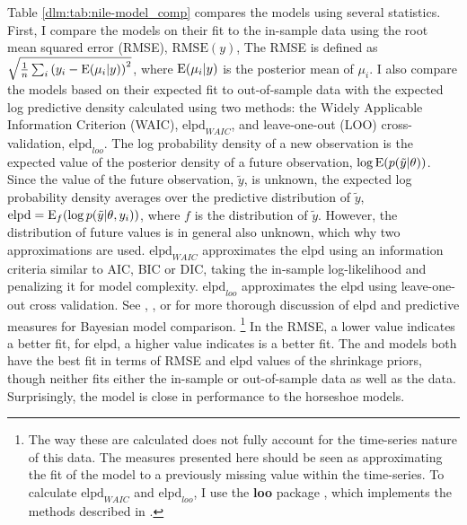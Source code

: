 \documentclass[12pt]{article}
\begin{document}
Table \ref{dlm:tab:nile-model_comp} compares the models using several statistics.
First, I compare the models on their fit to the in-sample data using the root mean squared error (RMSE), $\mathrm{RMSE}(y)$,
The RMSE is defined as $\sqrt{\frac{1}{n} \sum_{i} {(y_{i} - \operatorname{E}(\mu_{i} | y))}^{2}}$, where $\operatorname{E}(\mu_{i} | y)$ is the posterior mean of $\mu_{i}$.
I also compare the models based on their expected fit to out-of-sample data with the expected log predictive density calculated using two methods: the Widely Applicable Information Criterion (WAIC), $\mathrm{elpd}_{WAIC}$, and leave-one-out (LOO) cross-validation, $\mathrm{elpd}_{loo}$.
The log probability density of a new observation is the expected value of the posterior density of a future observation, $\log \operatorname{E}(p(\tilde{y} | \theta))$.
Since the value of the future observation, $\tilde{y}$, is unknown, the expected log probability density averages over the predictive distribution of $\tilde{y}$, $\mathrm{elpd} = \operatorname{E}_{f}(\log p(\tilde{y} | \theta, y_{i}))$, where $f$ is the distribution of $\tilde{y}$.
However, the distribution of future values is in general also unknown, which why two approximations are used.
$\mathrm{elpd}_{WAIC}$ approximates the $\mathrm{elpd}$ using an information criteria similar to AIC, BIC or DIC, taking the in-sample log-likelihood and penalizing it for model complexity.
$\mathrm{elpd}_{loo}$ approximates the $\mathrm{elpd}$ using leave-one-out cross validation.
See \textcite{GelmanCarlinSternEtAl2013a}, \textcites{GelmanVehtari2014a}, or \textcites{GelmanHwangVehtari2014a} for more thorough discussion of elpd and predictive measures for Bayesian model comparison.%
\footnote{
  The way these are calculated does not fully account for the time-series nature of this data.
  The measures presented here should be seen as approximating the fit of the model to a previously missing value within the time-series.
  To calculate $\mathrm{elpd}_{WAIC}$ and $\mathrm{elpd}_{loo}$, I use the \textbf{loo} \RLang{} package \parencite{VehtariGelmanGabry2015a}, which implements the methods described in \textcite{GelmanVehtari2014a}.
}
In the RMSE, a lower value indicates a better fit, for $\mathrm{elpd}$, a higher value indicates is a better fit.
The  and  models both have the best fit in terms of RMSE and $\mathrm{elpd}$ values of the shrinkage priors, though neither fits either the in-sample or out-of-sample data as well as the  data.
Surprisingly, the  model is close in performance to the horseshoe models.
\end{document}
